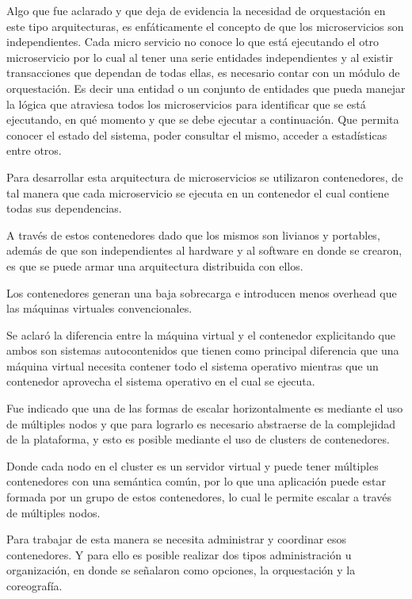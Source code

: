 Algo que fue aclarado y que deja de evidencia la necesidad de orquestación en este tipo arquitecturas, es enfáticamente el concepto de que los microservicios son independientes. 
Cada micro servicio no conoce lo que está ejecutando el otro microservicio por lo cual al tener una serie entidades independientes y al existir transacciones que dependan de todas ellas, es necesario contar con un módulo de orquestación. 
Es decir una entidad o un conjunto de entidades que pueda manejar la lógica que atraviesa todos los microservicios para identificar que se está ejecutando, en qué momento y que se debe ejecutar a continuación.
Que permita conocer el estado del sistema, poder consultar el mismo, acceder a estadísticas entre otros. 


Para desarrollar esta arquitectura de microservicios se utilizaron contenedores, de tal manera que cada microservicio se ejecuta en un contenedor el cual contiene todas sus dependencias.

A través de estos contenedores dado que los mismos son livianos y portables, además de que son independientes al hardware y al software en donde se crearon, es que se puede armar una arquitectura distribuida con ellos. 

Los contenedores generan una baja sobrecarga e introducen menos overhead que las máquinas virtuales convencionales. 


Se aclaró la diferencia entre la máquina virtual y el contenedor explicitando que ambos son sistemas autocontenidos que tienen como principal diferencia que una máquina virtual necesita contener todo el sistema operativo mientras que un contenedor aprovecha el sistema operativo en el cual se ejecuta. 


Fue indicado que una de las formas de escalar horizontalmente es mediante el uso de múltiples nodos y que para lograrlo es necesario abstraerse de la complejidad de la plataforma, y esto es posible mediante el uso de clusters de contenedores.


Donde cada nodo en el cluster es un servidor virtual y puede tener múltiples contenedores con una semántica común,
por lo que una aplicación puede estar formada por un grupo de estos contenedores, lo cual le permite escalar a través de múltiples nodos. 
 

Para trabajar de esta manera se necesita administrar y coordinar esos contenedores. 
Y para ello es posible realizar dos tipos administración u organización, en donde se señalaron como opciones, la orquestación y la coreografía. 

